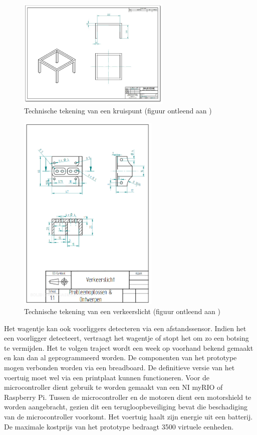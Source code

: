 \documentclass[a4paper,kulak]{kulakarticle} %
\begin{document}
\begin{figure}[h]
	\centering
	\includegraphics[width=0.65\textwidth]{tafelstel.png}
	\caption{Technische tekening van een kruispunt (figuur ontleend aan \cite{teamopdracht})}
	\label{techtekkruispunt}
\end{figure}

\begin{figure}
	\centering
	\includegraphics[width=0.6\textwidth]{verkeerslicht.png}
	\caption{Technische tekening van een verkeerslicht (figuur ontleend aan \cite{teamopdracht} )}
	\label{verkeerslicht}
\end{figure}

Het wagentje kan ook voorliggers detecteren via een afstandssensor. Indien het een voorligger detecteert, vertraagt het wagentje of stopt het om zo een botsing te vermijden.
Het te volgen traject wordt een week op voorhand bekend gemaakt en kan dan al geprogrammeerd worden.
De componenten van het prototype mogen verbonden worden via een breadboard. De definitieve versie van het voertuig moet wel via een printplaat kunnen functioneren. Voor de microcontroller dient gebruik te worden gemaakt van een NI myRIO of Raspberry Pi. Tussen de microcontroller en de motoren dient een motorshield te worden aangebracht, gezien dit een terugloopbeveiliging bevat die beschadiging van de microcontroller voorkomt. Het voertuig haalt zijn energie uit een batterij. De maximale kostprijs van het prototype bedraagt 3500 virtuele eenheden.
\end{document}
